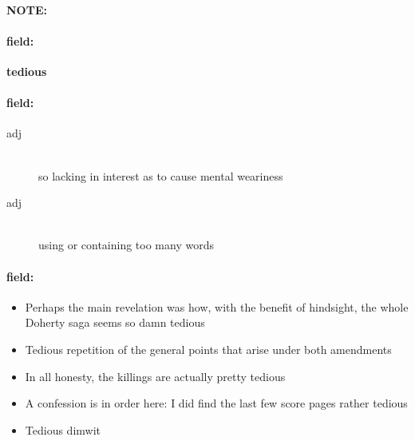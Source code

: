 \documentclass[12pt]{article}
\newenvironment{note}{\paragraph{NOTE:}}{}
\newenvironment{field}{\paragraph{field:}}{}
\begin{document}
\begin{note}
\begin{field}
\textbf{\large tedious}
\end{field}


\begin{field}
\begin{description}
\item[adj] \hfill \\ 
so lacking in interest as to cause mental weariness

\item[adj] \hfill \\ 
using or containing too many words

\end{description}
\end{field}

\begin{field}
\begin{itemize}
\item Perhaps the main revelation was how, with the benefit of hindsight, the whole Doherty saga seems so damn tedious
\item Tedious repetition of the general points that arise under both amendments
\item In all honesty, the killings are actually pretty tedious
\item A confession is in order here: I did find the last few score pages rather tedious
\item Tedious dimwit
\end{itemize}
\end{field}
\end{note}
\end{document}
